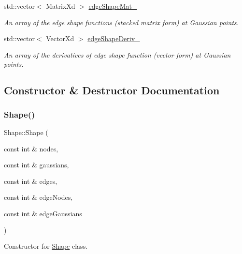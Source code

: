 \begin{DoxyCompactItemize}
std\+::vector$<$ Matrix\+Xd $>$ \mbox{\hyperlink{class_shape_af81a39560f87d14ba1a50c9eda7fff12}{edge\+Shape\+Mat\+\_\+}}
\begin{DoxyCompactList}\small\item\em An array of the edge shape functions (stacked matrix form) at Gaussian points. \end{DoxyCompactList}\item 
\mbox{\label{class_shape_a5cc69ac9662365109eabd0a193e48781}} 
std\+::vector$<$ Vector\+Xd $>$ \mbox{\hyperlink{class_shape_a5cc69ac9662365109eabd0a193e48781}{edge\+Shape\+Deriv\+\_\+}}
\begin{DoxyCompactList}\small\item\em An array of the derivatives of edge shape function (vector form) at Gaussian points. \end{DoxyCompactList}\end{DoxyCompactItemize}


\subsection{Constructor \& Destructor Documentation}
\mbox{\label{class_shape_aab720d4a61d7f8016ab9a72bab846cbe}} 
\subsubsection{\texorpdfstring{Shape()}{Shape()}}
{\footnotesize\ttfamily Shape\+::\+Shape (\begin{DoxyParamCaption}\item[{const int \&}]{nodes,  }\item[{const int \&}]{gaussians,  }\item[{const int \&}]{edges,  }\item[{const int \&}]{edge\+Nodes,  }\item[{const int \&}]{edge\+Gaussians }\end{DoxyParamCaption})}



Constructor for \mbox{\hyperlink{class_shape}{Shape}} class. 


